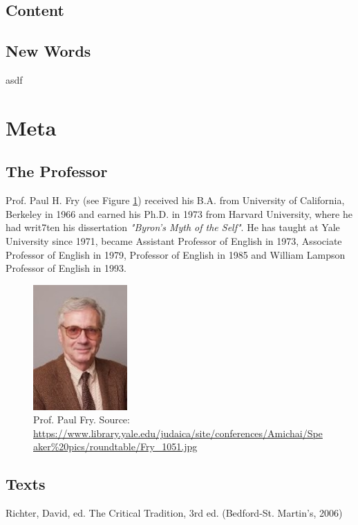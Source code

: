 \documentclass[]{scrartcl}
\begin{document}
\subsection{Content}


\subsection{New Words}

\begin{description}[leftmargin=!,labelwidth=\widthof{\bfseries Cartesian Revolution}]
  \item[Literature] asdf
\end{description}


\newpage
\section{Meta}
\subsection{The Professor}
Prof. Paul H. Fry (see Figure \ref{fig:paul_fry}) received his B.A. from University of California, Berkeley in 1966 and earned his Ph.D. in 1973 from Harvard University, where he had writ7ten his dissertation \emph{"Byron’s Myth of the Self"}. He has taught at Yale University since 1971, became Assistant Professor of English in 1973, Associate Professor of English in 1979, Professor of English in 1985 and William Lampson Professor of English in 1993.

\begin{figure}[]
	\centering
	\includegraphics[width=0.32\textwidth]{images/paul_fry.jpg}
	\caption{Prof. Paul Fry. Source: \url{https://www.library.yale.edu/judaica/site/conferences/Amichai/Speaker\%20pics/roundtable/Fry_1051.jpg}}
	\label{fig:paul_fry}
\end{figure}

\subsection{Texts}

Richter, David, ed. The Critical Tradition, 3rd ed. (Bedford-St. Martin's, 2006)
\end{document}
